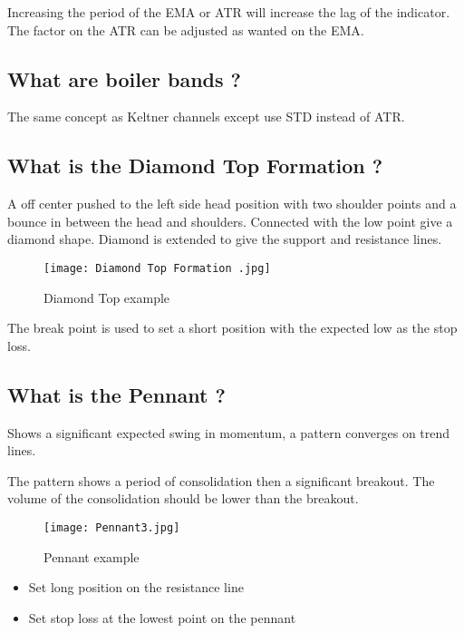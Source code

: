 \documentclass[11pt]{scrartcl} %
\begin{document}
Increasing the period of the EMA or ATR will increase the lag of the indicator.\\

The factor on the ATR can be adjusted as wanted on the EMA.

\subsection{What are boiler bands ?}

The same concept as Keltner channels except use STD instead of ATR.


\subsection{What is the Diamond Top Formation ?}

A off center pushed to the left side head position with two shoulder points and a bounce in between
the head and shoulders. Connected with the low point give a diamond shape. Diamond is extended to give
the support and resistance lines.

\begin{figure}[h] %
	\centering
	\texttt{[image: Diamond Top Formation .jpg]} %
	\caption{Diamond Top example}
\end{figure}

The break point is used to set a short position with the expected low as the stop loss.

\subsection{What is the Pennant ?}

Shows a significant expected swing in momentum, a pattern converges on trend lines.

The pattern shows a period of consolidation then a significant breakout. The volume of the consolidation
should be lower than the breakout.

\begin{figure}[h] %
	\centering
	\texttt{[image: Pennant3.jpg]} %
	\caption{Pennant example}
\end{figure}

\begin{itemize}
	\item Set long position on the resistance line 
	\item Set stop loss at the lowest point on the pennant
\end{itemize}
\end{document}
